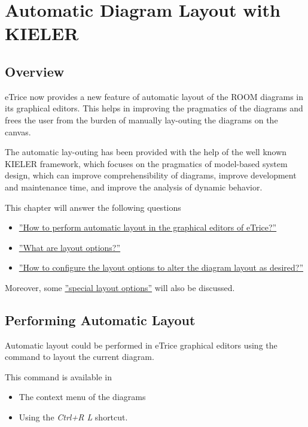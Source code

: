 \chapter{Automatic Diagram Layout with KIELER}

\section{Overview}

eTrice now provides a new feature of automatic layout of the ROOM diagrams in its graphical editors. This 
helps in improving the pragmatics of the diagrams and frees the user from the burden of manually 
lay-outing the diagrams on the canvas. 

The automatic lay-outing has been provided with the help of the well known KIELER framework, which focuses 
on the pragmatics of model-based system design, which can improve comprehensibility of diagrams, improve 
development and maintenance time, and improve the analysis of dynamic behavior.

This chapter will answer the following questions
\begin{itemize}
\item \hyperref[performLayout]{''How to perform automatic layout in the graphical editors of eTrice?''}
\item \hyperref[layoutOptions]{''What are layout options?''}
\item \hyperref[configureOptions]{''How to configure the layout options to alter the diagram layout as 
desired?''}
\end{itemize}

Moreover, some \hyperref[specialOptions]{''special layout options''} will also be discussed.

\section{\label{performLayout}Performing Automatic Layout} 

Automatic layout could be performed in eTrice graphical editors using the command to layout the current 
diagram.

This command is available in
\begin{itemize}
\item The context menu of the diagrams
\item Using the \textit{Ctrl+R L} shortcut.
\end{itemize}

